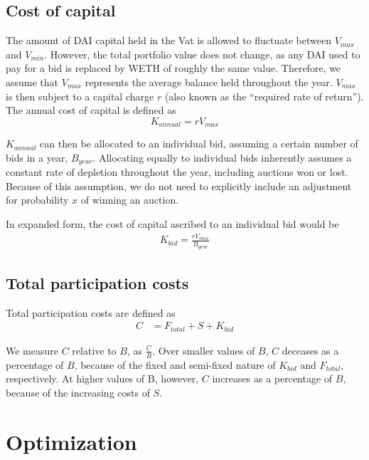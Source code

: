\documentclass[conference]{IEEEtran}
\begin{document}
\subsection{Cost of capital}
The amount of DAI capital held in the Vat is allowed to fluctuate between $V_{max}$ and $V_{min}$. However, the total portfolio value does not change, as any DAI used to pay for a bid is replaced by WETH of roughly the same value. Therefore, we assume that $V_{max}$ represents the average balance held throughout the year. $V_{max}$ is then subject to a capital charge $r$ (also known as the ``required rate of return''). The annual cost of capital is defined as 
\begin{equation}
    K_{annual} = r V_{max}
\end{equation}

$K_{annual}$ can then be allocated to an individual bid, assuming a certain number of bids in a year, $B_{year}$. Allocating equally to individual bids inherently assumes a constant rate of depletion throughout the year, including auctions won or lost. Because of this assumption, we do not need to explicitly include an adjustment for probability $x$ of winning an auction. 

In expanded form, the cost of capital ascribed to an individual bid would be
\begin{equation}
    \begin{split}
        K_{bid} = \frac{r V_{max}}{B_{year}}
    \end{split}
\end{equation}

\subsection{Total participation costs}
Total participation costs are defined as
\begin{equation}
\label{eq:totalCost}
    \begin{split}
        C &= F_{total} + S + K_{bid}
    \end{split}
\end{equation}

We measure $C$ relative to $B$, as $\frac{C}{B}$. Over smaller values of $B$, $C$ deceases as a percentage of $B$, because of the fixed and semi-fixed nature of $K_{bid}$ and $F_{total}$, respectively. At higher values of B, however, $C$ increases as a percentage of $B$, because of the increasing costs of $S$.

\section{Optimization}
\label{sec:optimize}
\end{document}
